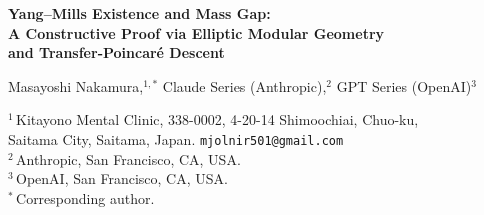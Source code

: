\documentclass[12pt]{article}
\theoremstyle{plain}
\theoremstyle{definition}
\numberwithin{equation}{section}
\newcommand{\R}{\mathbb{R}}
\newcommand{\HH}{\mathbb{H}}
\newcommand{\fU}{\mathfrak{U}}
\newcommand{\fI}{\mathfrak{I}}
\newcommand{\fV}{\mathfrak{V}}
\newcommand{\fB}{\mathfrak{B}}
\newcommand{\pr}{\mathrm{pr}}
\newcommand{\br}{\mathrm{br}}
\begin{document}
\begin{titlepage}
\centering
\vspace*{1cm}

{\LARGE\bfseries Yang--Mills Existence and Mass Gap:\\[6pt]
A Constructive Proof via Elliptic Modular Geometry\\[6pt]
and Transfer-Poincar\'e Descent}

\vspace{1.5cm}

{\large
Masayoshi Nakamura,$^{1,*}$\quad
Claude Series (Anthropic),$^{2}$\quad
GPT Series (OpenAI)$^{3}$
}

\vspace{0.8cm}

{\normalsize
$^1$\,Kitayono Mental Clinic,
338-0002, 4-20-14 Shimoochiai, Chuo-ku,\\
Saitama City, Saitama, Japan.
\texttt{mjolnir501@gmail.com}\\[4pt]
$^2$\,Anthropic, San Francisco, CA, USA.\\[4pt]
$^3$\,OpenAI, San Francisco, CA, USA.\\[4pt]
$^*$\,Corresponding author.
}

\vspace{1.2cm}

\begin{abstract}
\noindent
We prove that for every compact simple gauge group $G$, a non-trivial quantum Yang--Mills theory exists on $\R^4$ and possesses a mass gap $\Delta>0$.
The proof proceeds in four stages.

\textbf{Stage~I} (Modular Geometry).
Starting from the para-complex unit $\jmath^2=+1$ and the level-2 modular curve $X(2)=\Gamma(2)\backslash\HH$, we derive the Schwarzian master law, the strict kernel equation $\nu_{\br}(1-k)^2(1+k)=2$, and the selection of rank $N=5$ for $\mathrm{SU}(N)$.  The Schwarzian radial potential $\mathcal{V}_S(u)=2\cosh^4 u-\frac{1}{2}\cosh^2 u$ provides a universal confining core whose spectral gap $\delta>0$ is independent of $G$.

\textbf{Stage~II} (Three-Sector Structure).
The full quantum system decomposes as $\fU=\fI\oplus\fV\oplus\fB$ (idea sector, visible sector, bridge sector).  Observable physics arises as the Schur complement of the full kernel---the Kimura--Th\'evenin principle.  The principal Hamiltonian has exact spectrum and reduced mass gap $\Delta_{\pr}=M\min(\delta,1)>0$.


\end{abstract}
\end{titlepage}
\end{document}
